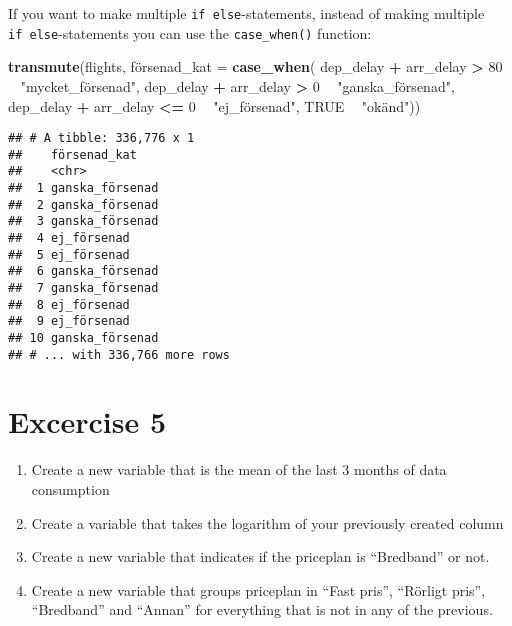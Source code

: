 \documentclass[]{book}
\newenvironment{Shaded}{\begin{snugshade}}{\end{snugshade}}
\newcommand{\DataTypeTok}[1]{\textcolor[rgb]{0.13,0.29,0.53}{#1}}
\newcommand{\DecValTok}[1]{\textcolor[rgb]{0.00,0.00,0.81}{#1}}
\newcommand{\KeywordTok}[1]{\textcolor[rgb]{0.13,0.29,0.53}{\textbf{#1}}}
\newcommand{\NormalTok}[1]{#1}
\newcommand{\OperatorTok}[1]{\textcolor[rgb]{0.81,0.36,0.00}{\textbf{#1}}}
\newcommand{\OtherTok}[1]{\textcolor[rgb]{0.56,0.35,0.01}{#1}}
\newcommand{\StringTok}[1]{\textcolor[rgb]{0.31,0.60,0.02}{#1}}
\begin{document}
If you want to make multiple \texttt{if\ else}-statements, instead of making multiple \texttt{if\ else}-statements you can use the \texttt{case\_when()} function:

\begin{Shaded}
\begin{Highlighting}[]
\KeywordTok{transmute}\NormalTok{(flights, fö}\DataTypeTok{rsenad_kat =} \KeywordTok{case_when}\NormalTok{(}
\NormalTok{  dep_delay }\OperatorTok{+}\StringTok{ }\NormalTok{arr_delay }\OperatorTok{>}\StringTok{ }\DecValTok{80} \OperatorTok{~}\StringTok{ "mycket_försenad"}\NormalTok{,}
\NormalTok{  dep_delay }\OperatorTok{+}\StringTok{ }\NormalTok{arr_delay }\OperatorTok{>}\StringTok{ }\DecValTok{0} \OperatorTok{~}\StringTok{ "ganska_försenad"}\NormalTok{,}
\NormalTok{  dep_delay }\OperatorTok{+}\StringTok{ }\NormalTok{arr_delay  }\OperatorTok{<=}\StringTok{ }\DecValTok{0} \OperatorTok{~}\StringTok{ "ej_försenad"}\NormalTok{,}
  \OtherTok{TRUE} \OperatorTok{~}\StringTok{ "okänd"}\NormalTok{))}
\end{Highlighting}
\end{Shaded}

\begin{verbatim}
## # A tibble: 336,776 x 1
##    försenad_kat   
##    <chr>          
##  1 ganska_försenad
##  2 ganska_försenad
##  3 ganska_försenad
##  4 ej_försenad    
##  5 ej_försenad    
##  6 ganska_försenad
##  7 ganska_försenad
##  8 ej_försenad    
##  9 ej_försenad    
## 10 ganska_försenad
## # ... with 336,766 more rows
\end{verbatim}

\hypertarget{excercise-5}{%
\section{Excercise 5}\label{excercise-5}}

\begin{enumerate}
\def\labelenumi{\arabic{enumi}.}
\item
  Create a new variable that is the mean of the last 3 months of data consumption
\item
  Create a variable that takes the logarithm of your previously created column
\item
  Create a new variable that indicates if the priceplan is ``Bredband'' or not.
\item
  Create a new variable that groups priceplan in ``Fast pris'', ``Rörligt pris'', ``Bredband'' and ``Annan'' for everything that is not in any of the previous.
\end{enumerate}
\end{document}
